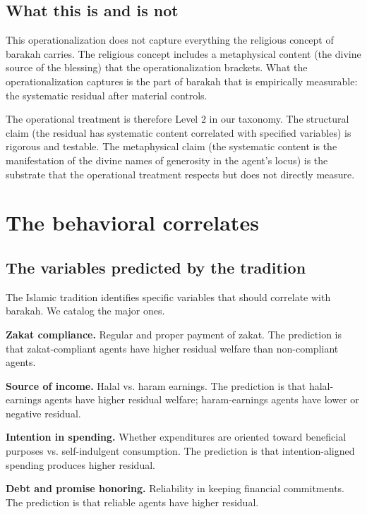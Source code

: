 \subsection{What this is and is not}

This operationalization does not capture everything the religious
concept of barakah carries. The religious concept includes a
metaphysical content (the divine source of the blessing) that the
operationalization brackets. What the operationalization captures
is the part of barakah that is empirically measurable: the
systematic residual after material controls.

The operational treatment is therefore Level 2 in our taxonomy.
The structural claim (the residual has systematic content
correlated with specified variables) is rigorous and testable.
The metaphysical claim (the systematic content is the
manifestation of the divine names of generosity in the agent's
locus) is the substrate that the operational treatment respects
but does not directly measure.

\section{The behavioral correlates}
\label{sec:bar-correlates}

\subsection{The variables predicted by the tradition}

The Islamic tradition identifies specific variables that should
correlate with barakah. We catalog the major ones.

\textbf{Zakat compliance.} Regular and proper payment of zakat. The
prediction is that zakat-compliant agents have higher residual
welfare than non-compliant agents.

\textbf{Source of income.} Halal vs. haram earnings. The
prediction is that halal-earnings agents have higher residual
welfare; haram-earnings agents have lower or negative residual.

\textbf{Intention in spending.} Whether expenditures are
oriented toward beneficial purposes vs. self-indulgent
consumption. The prediction is that intention-aligned spending
produces higher residual.

\textbf{Debt and promise honoring.} Reliability in keeping
financial commitments. The prediction is that reliable agents
have higher residual.

